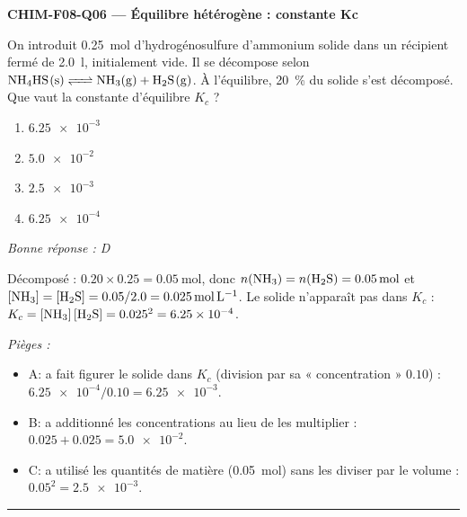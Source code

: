 \documentclass[11pt,a4paper]{article}
\begin{document}
\noindent\textbf{CHIM-F08-Q06 --- Équilibre hétérogène : constante Kc}\par
On introduit \qty{0.25}{\mol} d'hydrogénosulfure d'ammonium  solide dans un récipient fermé de \qty{2.0}{\litre}, initialement vide. Il se décompose selon $\ce{NH4HS(s) <=> NH3(g) + H2S(g)}$. À l'équilibre, \qty{20}{\percent} du solide s'est décomposé. Que vaut la constante d'équilibre $K_c$ ?
\begin{enumerate}[label=\Alph*)]
\item $\num{6.25e-3}$
\item $\num{5.0e-2}$
\item $\num{2.5e-3}$
\item $\num{6.25e-4}$
\end{enumerate}
\textit{Bonne réponse : D}\par
Décomposé : $\num{0.20}\times\num{0.25}=\qty{0.05}{\mol}$, donc $n(\ce{NH3})=n(\ce{H2S})=\qty{0.05}{\mol}$ et $[\ce{NH3}]=[\ce{H2S}]=\num{0.05}/\num{2.0}=\qty{0.025}{\mol\per\litre}$. Le solide  n'apparaît pas dans $K_c$ : $K_c=[\ce{NH3}]\,[\ce{H2S}]=\num{0.025}^2=\num{6.25e-4}$.\par
\textit{Pièges :}
\begin{itemize}
\item A: a fait figurer le solide dans $K_c$ (division par sa « concentration » $\num{0.10}$) : $\num{6.25e-4}/\num{0.10}=\num{6.25e-3}$.
\item B: a additionné les concentrations au lieu de les multiplier : $\num{0.025}+\num{0.025}=\num{5.0e-2}$.
\item C: a utilisé les quantités de matière (\qty{0.05}{\mol}) sans les diviser par le volume : $\num{0.05}^2=\num{2.5e-3}$.
\end{itemize}
\vspace{8pt}\hrule\vspace{8pt}
\end{document}
